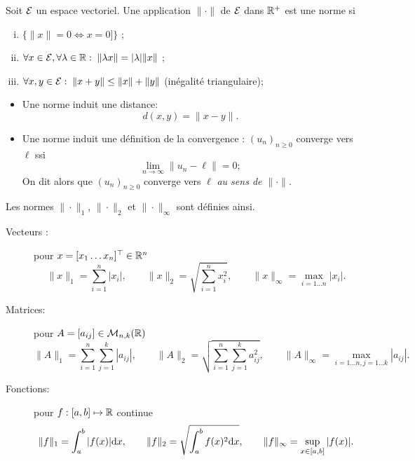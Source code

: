 \begin{definition}[Norme]
  Soit $\mathcal{E}$ un espace vectoriel. Une application $\|\cdot\|$ de $\mathcal{E}$ dans $\mathbb{R}^+$ est une norme si
  \begin{enumerate}[(i)]
    \item $\{\|x\| = 0 \Leftrightarrow x = 0]\}$ ;
    \item $\forall x \in \mathcal{E}, \forall \lambda \in \mathbb{R}: \; \|\lambda x\| = |\lambda| \|x\|$ ;
    \item $\forall x, y \in \mathcal{E}: \; \|x+y\| \leq \|x\| + \|y\|$ (inégalité triangulaire);
  \end{enumerate}
\end{definition}

\remarks
\begin{itemize}
  \item Une norme induit une distance:
  $$
  d(x, y) = \|x - y\|.
  $$
  \item Une norme induit une définition de la convergence : $(u_n)_{n \geq 0}$ converge vers $\ell$ ssi
  $$
  \lim_{n \rightarrow \infty} \|u_n - \ell\| = 0;
  $$
  On dit alors que $(u_n)_{n \geq 0}$ converge vers $\ell$ {\em au sens de $\|\cdot\|$}.
\end{itemize}

\begin{definition}
  Les normes $\|\cdot\|_1$, $\|\cdot\|_2$ et $\|\cdot\|_\infty$ sont définies ainsi.
  \begin{description}
    \item[Vecteurs :] pour $x = [x_1 \dots x_n]^\top \in \mathbb{R}^n$
    $$
    \|x\|_1 = \sum_{i=1}^n |x_i|, \qquad 
    \|x\|_2 = \sqrt{\sum_{i=1}^n x_i^2}, \qquad 
    \|x\|_\infty = \max_{i = 1 \dots n} |x_i|. 
    $$
    \item[Matrices:] pour $A = [a_{ij}] \in \mathcal{M}_{n, k}(\mathbb{R})$
    $$
    \|A\|_1 = \sum_{i=1}^n \sum_{j=1}^k |a_{ij}|, \qquad 
    \|A\|_2 = \sqrt{\sum_{i=1}^n \sum_{j=1}^k a_{ij}^2}, \qquad 
    \|A\|_\infty = \max_{i = 1 \dots n, j = 1 \dots k} |a_{ij}|. 
    $$
    \item[Fonctions:] pour $f : [a, b] \mapsto \mathbb{R}$ continue
    $$
    \|f\|_1 = \int_a^b |f(x)| \text{d} x, \qquad 
    \|f\|_2 = \sqrt{\int_a^b f(x)^2 \text{d} x}, \qquad 
    \|f\|_\infty = \sup_{x \in [a, b]} |f(x)|.
    $$
  \end{description}
\end{definition}

